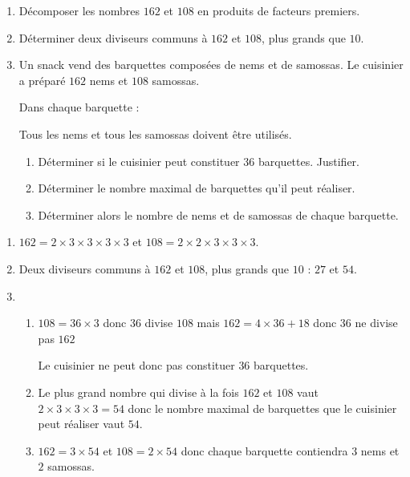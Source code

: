 \begin{exercice*}[Chinoiseries]
    \begin{enumerate}
        \item Décomposer les nombres $162$ et $108$ en produits de facteurs premiers.
        \item Déterminer deux diviseurs communs à $162$ et $108$, plus grands que $10$.
        \item Un snack vend des barquettes composées de nems et de samossas. Le cuisinier a préparé $162$ nems et $108$ samossas.
        
        Dans chaque barquette :
        Tous les nems et tous les samossas doivent être utilisés.
        \begin{enumerate}
            \item Déterminer si le cuisinier peut constituer $36$ barquettes. Justifier.
            \item Déterminer le nombre maximal de barquettes qu'il peut réaliser.
            \item Déterminer alors le nombre de nems et de samossas de chaque barquette.
        \end{enumerate}        
    \end{enumerate}
\end{exercice*}
\begin{corrige}
    \begin{enumerate}
        \item $162=2\times 3\times 3\times 3\times 3$ et $108 = 2\times 2\times 3\times 3\times 3$.
        \item Deux diviseurs communs à $162$ et $108$, plus grands que $10$ : $27$ et $54$.
        \item 
        \begin{enumerate}
            \item $108 = 36\times 3$ donc $36$ divise $108$ mais $162 = 4\times 36 + 18$ donc $36$ ne divise pas $162$
            
            Le cuisinier ne peut donc pas constituer $36$ barquettes.
            \item Le plus grand nombre qui divise à la fois $162$ et $108$ vaut $2\times 3\times 3\times 3 = 54$ donc le nombre maximal de barquettes
            que le cuisinier peut réaliser vaut $54$.
            \item $162 = 3\times 54$ et $108 = 2\times 54$ donc chaque barquette contiendra $3$ nems et $2$ samossas.
        \end{enumerate}        
    \end{enumerate}     
\end{corrige}

